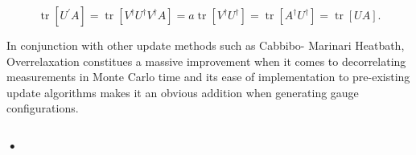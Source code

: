 \documentclass[a4paper,10pt]{article}
\begin{document}
\begin{equation}
\operatorname{tr}\left[U^{\prime} A\right]=\operatorname{tr}\left[V^{\dagger} U^{\dagger} V^{\dagger} A\right]=a \operatorname{tr}\left[V^{\dagger} U^{\dagger}\right]=\operatorname{tr}\left[A^{\dagger} U^{\dagger}\right]=\operatorname{tr}[U A].
\end{equation}

In conjunction with other update methods such as Cabbibo- Marinari Heatbath, Overrelaxation constitues a massive improvement when it comes to decorrelating measurements in Monte Carlo time \cite{PhysRevLett.58.2394} and its ease of implementation to pre-existing update algorithms makes it an obvious addition when generating gauge configurations.

\subsubsection{•}
\end{document}
